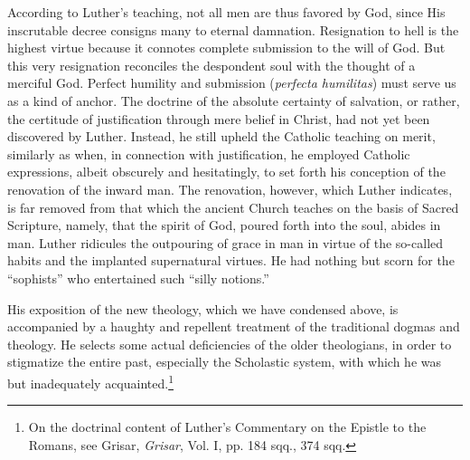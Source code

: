 According to Luther’s teaching, not all men are thus favored by
God, since His inscrutable decree consigns many to eternal damnation.
Resignation to hell is the highest virtue because it connotes
complete submission to the will of God. But this very resignation
reconciles the despondent soul with the thought of a merciful God.
Perfect humility and submission (\textit{perfecta humilitas}) must serve us
as a kind of anchor. The doctrine of the absolute certainty of salvation,
or rather, the certitude of justification through mere belief
in Christ, had not yet been discovered by Luther. Instead, he still
upheld the Catholic teaching on merit, similarly as when, in connection
with justification, he employed Catholic expressions, albeit
obscurely and hesitatingly, to set forth his conception of the renovation
of the inward man. The renovation, however, which Luther
indicates, is far removed from that which the ancient Church teaches
on the basis of Sacred Scripture, namely, that the spirit of God,
poured forth into the soul, abides in man. Luther ridicules the outpouring
of grace in man in virtue of the so-called habits and the implanted
supernatural virtues. He had nothing but scorn for the
“sophists” who entertained such “silly notions.”

His exposition of the new theology, which we have condensed
above, is accompanied by a haughty and repellent treatment of the
traditional dogmas and theology. He selects some actual deficiencies
of the older theologians, in order to stigmatize the entire past, especially
the Scholastic system, with which he was but inadequately acquainted.\footnote
{On the doctrinal content of Luther's Commentary on the Epistle to the Romans, see
Grisar, \textit{Grisar}, Vol. I, pp. 184 sqq., 374 sqq.}
